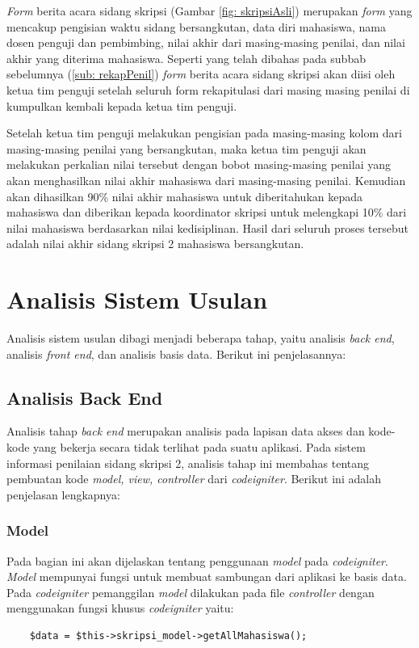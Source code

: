 	\textit{Form} berita acara sidang skripsi (Gambar \ref{fig: skripsiAsli}) merupakan \textit{form} yang mencakup pengisian waktu sidang bersangkutan, data diri mahasiswa, nama dosen penguji dan pembimbing, nilai akhir dari masing-masing penilai, dan nilai akhir yang diterima mahasiswa. Seperti yang telah dibahas pada subbab sebelumnya (\ref{sub: rekapPenil}) \textit{form} berita acara sidang skripsi akan diisi oleh ketua tim penguji setelah seluruh form rekapitulasi dari masing masing penilai di kumpulkan kembali kepada ketua tim penguji.
	
	Setelah ketua tim penguji melakukan pengisian pada masing-masing kolom dari masing-masing penilai yang bersangkutan, maka ketua tim penguji akan melakukan perkalian nilai tersebut dengan bobot masing-masing penilai yang akan menghasilkan nilai akhir mahasiswa dari masing-masing penilai. Kemudian akan dihasilkan 90\% nilai akhir mahasiswa untuk diberitahukan kepada mahasiswa dan diberikan kepada koordinator skripsi untuk melengkapi 10\% dari nilai mahasiswa berdasarkan nilai kedisiplinan. Hasil dari seluruh proses tersebut adalah nilai akhir sidang skripsi 2 mahasiswa bersangkutan.
	
\section{Analisis Sistem Usulan}
\label{sec: analisisSUsulan}

Analisis sistem usulan dibagi menjadi beberapa tahap, yaitu analisis \textit{back end}, analisis \textit{front end}, dan analisis basis data. Berikut ini penjelasannya:
	
	\subsection{Analisis Back End}
	\label{sub: backEnd}
	
	Analisis tahap \textit{back end} merupakan analisis pada lapisan data akses dan kode-kode yang bekerja secara tidak terlihat pada suatu aplikasi. Pada sistem informasi penilaian sidang skripsi 2, analisis tahap ini membahas tentang pembuatan kode \textit{model, view, controller} dari \textit{codeigniter}. Berikut ini adalah penjelasan lengkapnya:
	
	\subsubsection{Model}
	\label{subsub: modelCI}
	
	Pada bagian ini akan dijelaskan tentang penggunaan \textit{model} pada \textit{codeigniter}. \textit{Model} mempunyai fungsi untuk membuat sambungan dari aplikasi ke basis data. Pada \textit{codeigniter} pemanggilan \textit{model} dilakukan pada file \textit{controller} dengan menggunakan fungsi khusus \textit{codeigniter} yaitu:
	\begin{lstlisting}
	$data = $this->skripsi_model->getAllMahasiswa();
	\end{lstlisting}
	
